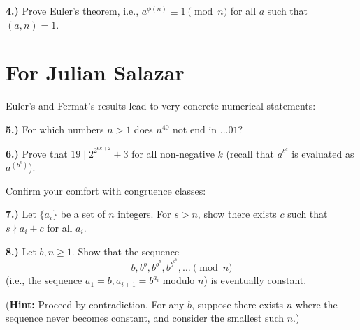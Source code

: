 \documentclass[10pt]{amsart}
\begin{document}
\medskip

{\bf 4.)} Prove Euler's theorem, i.e., $a^{\phi(n)} \equiv 1 \pmod n$ for all $a$ such that $(a,n) = 1$.

\section*{For Julian Salazar}

\noindent Euler's and Fermat's results lead to very concrete numerical statements:

\medskip

{\bf 5.)} For which numbers $n > 1$ does $n^{40}$ not end in $...01$?

\medskip

{\bf 6.)} Prove that $19 \mid 2^{2^{6k+2}} + 3$ for all non-negative $k$ (recall that $a^{b^c}$ is evaluated as $a^{(b^c)}$).

\medskip
 
\noindent Confirm your comfort with congruence classes:

\medskip

{\bf 7.)} Let $\{a_i\}$ be a set of $n$ integers. For $s > n$, show there exists $c$ such that $s \nmid a_i + c$ for all $a_i$.

\medskip

{\bf 8.)} Let $b, n \ge 1$. Show that the sequence
\[
b, b^b, b^{b^b}, b^{b^{b^b}}, \dotsc \pmod{n}
\]
(i.e., the sequence $a_1 = b, a_{i+1} = b^{a_{i}}$ modulo $n$) is eventually constant.

\smallskip

({\bf Hint:} Proceed by contradiction. For any $b$, suppose there exists $n$ where the sequence never becomes constant, and consider the smallest such $n$.)
\end{document}

